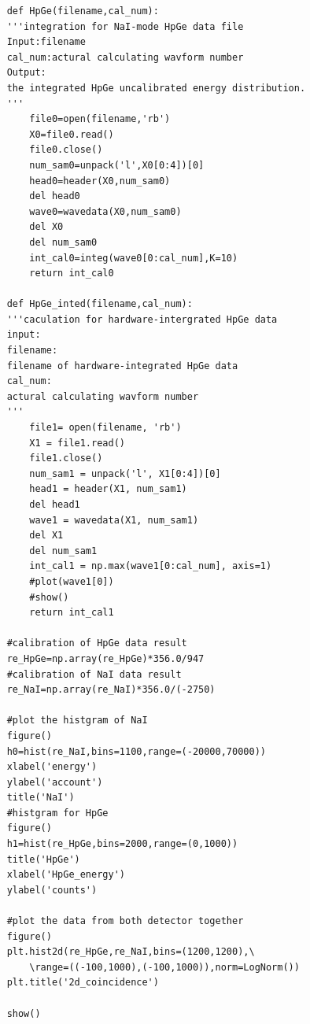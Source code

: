 \documentclass[12pt]{article}
\begin{document}
\begin{lstlisting}
	def HpGe(filename,cal_num):
	'''integration for NaI-mode HpGe data file
	Input:filename
	cal_num:actural calculating wavform number
	Output:
	the integrated HpGe uncalibrated energy distribution.
	'''
		file0=open(filename,'rb')
		X0=file0.read()
		file0.close()
		num_sam0=unpack('l',X0[0:4])[0]
		head0=header(X0,num_sam0)
		del head0
		wave0=wavedata(X0,num_sam0)
		del X0
		del num_sam0
		int_cal0=integ(wave0[0:cal_num],K=10)
		return int_cal0
		
	def HpGe_inted(filename,cal_num):
	'''caculation for hardware-intergrated HpGe data
	input:
	filename:
	filename of hardware-integrated HpGe data
	cal_num:
	actural calculating wavform number
	'''
		file1= open(filename, 'rb')
		X1 = file1.read()
		file1.close()
		num_sam1 = unpack('l', X1[0:4])[0]
		head1 = header(X1, num_sam1)
		del head1
		wave1 = wavedata(X1, num_sam1)
		del X1
		del num_sam1
		int_cal1 = np.max(wave1[0:cal_num], axis=1)
		#plot(wave1[0])
		#show()
		return int_cal1
		
	#calibration of HpGe data result
	re_HpGe=np.array(re_HpGe)*356.0/947
	#calibration of NaI data result
	re_NaI=np.array(re_NaI)*356.0/(-2750)
			
	#plot the histgram of NaI 
	figure()
	h0=hist(re_NaI,bins=1100,range=(-20000,70000))
	xlabel('energy')
	ylabel('account')
	title('NaI')
	#histgram for HpGe
	figure()
	h1=hist(re_HpGe,bins=2000,range=(0,1000))
	title('HpGe')
	xlabel('HpGe_energy')
	ylabel('counts')
	
	#plot the data from both detector together
	figure()
	plt.hist2d(re_HpGe,re_NaI,bins=(1200,1200),\
		\range=((-100,1000),(-100,1000)),norm=LogNorm())
	plt.title('2d_coincidence')
	
	show()
	
	
	\end{lstlisting}
\end{document}
